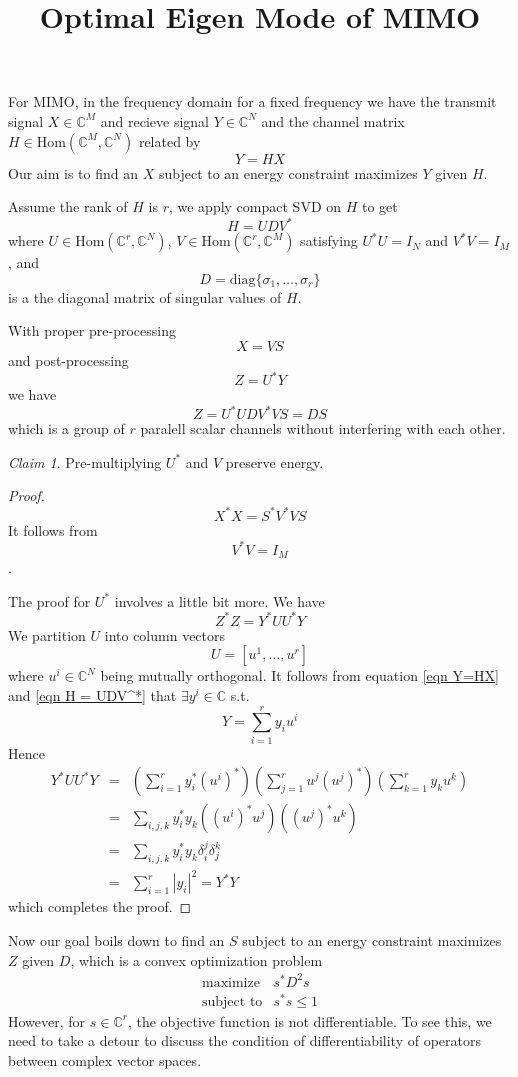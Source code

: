 \documentclass[12pt]{article}
\title{Optimal Eigen Mode of MIMO}
\theoremstyle{remark}
\newtheorem{claim}{Claim}
\begin{document}
\maketitle

For MIMO, in the frequency domain for a fixed frequency we have the transmit signal $X\in\mathbb{C}^M$ and recieve signal $Y\in \mathbb{C}^N$ and the channel matrix $H\in\mbox{Hom}\left(\mathbb{C}^M, \mathbb{C}^N\right)$ related by
\begin{equation}
Y=HX\label{eqn Y=HX}
\end{equation}
Our aim is to find an $X$ subject to an energy constraint maximizes $Y$ given $H$. 

Assume the rank of $H$ is $r$, we apply compact SVD on $H$ to get
\begin{equation}
	H = UDV^*\label{eqn H = UDV^*}
\end{equation}
where $U\in\mbox{Hom}\left(\mathbb{C}^r,\mathbb{C}^N \right)$, $V\in\mbox{Hom}\left(\mathbb{C}^r,\mathbb{C}^M \right)$ satisfying $U^*U=I_N$ and $V^*V=I_M$, and
$$
D=\mbox{diag}\{\sigma_1,\dots,\sigma_r \}
$$
is a the diagonal matrix of singular values of $H$.

With proper pre-processing
$$X=VS$$
and post-processing
$$Z=U^*Y$$
we have
$$Z=U^*UDV^*VS=DS$$
which is a group of $r$ paralell scalar channels without interfering with each other.
\begin{claim}
	Pre-multiplying $U^*$ and $V$ preserve energy.
\end{claim}
\begin{proof}
	$$X^*X=S^*V^*VS$$
	It follows from $$V^*V=I_M$$.
	
	The proof for $U^*$ involves a little bit more. We have
	$$Z^*Z=Y^*UU^*Y$$
	We partition $U$ into column vectors
	$$U=\left[u^1,\dots,u^r \right]$$
	where $u^i\in\mathbb{C}^N$ being mutually orthogonal. It follows from equation \ref{eqn Y=HX} and \ref{eqn H = UDV^*} that $\exists y^i\in\mathbb{C}$ s.t. 
	$$Y=\sum_{i=1}^ry_iu^i$$
	Hence
	\begin{eqnarray*}
		Y^*UU^*Y&=&\left(\sum_{i=1}^ry_i^*(u^i)^* \right)\left(\sum_{j=1}^ru^j(u^j)^* \right)\left(\sum_{k=1}^ry_ku^k\right)\\
		&=&\sum_{i,j,k}y_i^*y_k\left((u^i)^*u^j\right)\left((u^j)^*u^k\right)\\
		&=&\sum_{i,j,k}y_i^*y_k\delta_i^j\delta_j^k\\
		&=&\sum_{i=1}^r|y_i|^2=Y^*Y
	\end{eqnarray*}
which completes the proof.
\end{proof}
Now our goal boils down to find an $S$ subject to an energy constraint maximizes $Z$ given $D$, which is a convex optimization problem
\begin{equation}
	\begin{array}{ll}
	\mbox{maximize}&s^*D^2s\\
	\mbox{subject to}&s^*s\leq1
\end{array}\label{eqn s^*D^2s}
\end{equation}
However, for $s\in\mathbb{C}^r$, the objective function is not differentiable. To see this, we need to take a detour to discuss the condition of differentiability of operators between complex vector spaces.
\end{document}
